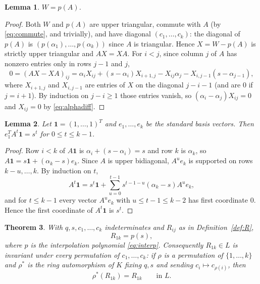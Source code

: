 \documentclass[11pt]{amsart}
\newtheorem{theorem}{Theorem}[section]
\newtheorem{lemma}[theorem]{Lemma}
\theoremstyle{definition}
\newcommand{\one}{\mathbf{1}}
\begin{document}
\begin{lemma}\label{lem:WpA}
$W=p(A)$.
\end{lemma}

\begin{proof}
Both $W$ and $p(A)$ are upper triangular, commute with $A$ (by \eqref{eq:commute}, and trivially), and have diagonal $(c_1,\dots,c_k)$: the diagonal of $p(A)$ is $(p(\alpha_1),\dots,p(\alpha_k))$ since $A$ is triangular. Hence $X=W-p(A)$ is strictly upper triangular and $AX=XA$. For $i<j$, since column $j$ of $A$ has nonzero entries only in rows $j-1$ and $j$,
\[
0=(AX-XA)_{ij}=\alpha_iX_{ij}+(s-\alpha_i)X_{i+1,j}-X_{ij}\alpha_j-X_{i,j-1}(s-\alpha_{j-1}),
\]
where $X_{i+1,j}$ and $X_{i,j-1}$ are entries of $X$ on the diagonal $j-i-1$ (and are $0$ if $j=i+1$). By induction on $j-i\ge1$ those entries vanish, so $(\alpha_i-\alpha_j)X_{ij}=0$ and $X_{ij}=0$ by \eqref{eq:alphadiff}.
\end{proof}

\begin{lemma}\label{lem:moments}
Let $\one=(1,\dots,1)^{T}$ and $e_1,\dots,e_k$ be the standard basis vectors. Then $e_1^{T}A^{t}\one=s^{t}$ for $0\le t\le k-1$.
\end{lemma}

\begin{proof}
Row $i<k$ of $A\one$ is $\alpha_i+(s-\alpha_i)=s$ and row $k$ is $\alpha_k$, so $A\one=s\one+(\alpha_k-s)e_k$. Since $A$ is upper bidiagonal, $A^{u}e_k$ is supported on rows $k-u,\dots,k$. By induction on $t$,
\[
A^{t}\one=s^{t}\one+\sum_{u=0}^{t-1}s^{t-1-u}(\alpha_k-s)A^{u}e_k,
\]
and for $t\le k-1$ every vector $A^{u}e_k$ with $u\le t-1\le k-2$ has first coordinate $0$. Hence the first coordinate of $A^{t}\one$ is $s^{t}$.
\end{proof}

\begin{theorem}\label{thm:generic}
With $q,s,c_1,\dots,c_k$ indeterminates and $R_{ij}$ as in Definition~\ref{def:R},
\[
R_{1k}=p(s),
\]
where $p$ is the interpolation polynomial \eqref{eq:interp}. Consequently $R_{1k}\in L$ is invariant under every permutation of $c_1,\dots,c_k$: if $\rho$ is a permutation of $\{1,\dots,k\}$ and $\rho^*$ is the ring automorphism of $K$ fixing $q,s$ and sending $c_i\mapsto c_{\rho(i)}$, then
\begin{equation}\label{eq:genericsym}
\rho^*(R_{1k})=R_{1k}\qquad\text{in }L.
\end{equation}
\end{theorem}
\end{document}
